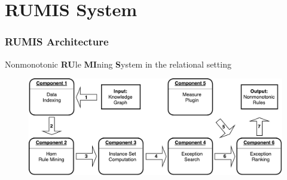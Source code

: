 \documentclass{beamer}
\newcommand{\makeoverview}{%
  \begin{frame}
    \frametitle{Outline}
    \tableofcontents
  \end{frame}
}
\newcommand{\bl}[1]{\textcolor{blue}{#1}}
\newcommand{\gr}[1]{\textcolor{darkgreen}{#1}}
\def\cG{\ensuremath{\mathcal{G}}}
\def\cR{\ensuremath{\mathcal{R}}}
\newcommand{\mi}[1]{\ensuremath{\mathit{#1}}}
\begin{document}




\section{RUMIS System}

\begin{frame}\frametitle{RUMIS Architecture}

\bigskip
\centerline{Nonmonotonic \textbf{RU}le \textbf{MI}ning \textbf{S}ystem in the relational setting}
\smallskip

\begin{figure}[h]
	\centering
	\includegraphics[page=1,width=1.\textwidth]{system_overview.pdf}
\end{figure}

\end{frame}
\end{document}
